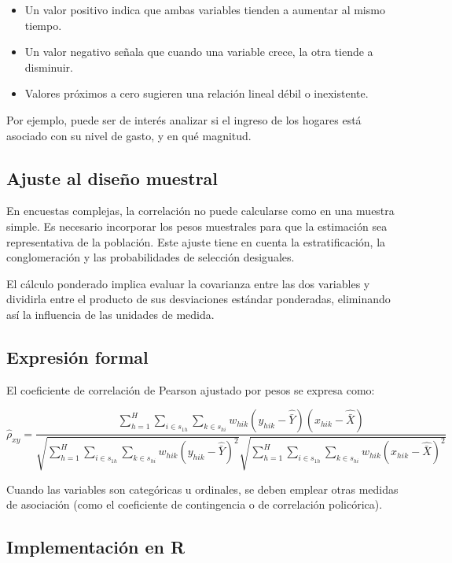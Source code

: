\documentclass[
  12pt,
]{book}
\providecommand{\tightlist}{%
  \setlength{\itemsep}{0pt}\setlength{\parskip}{0pt}}
\begin{document}
\begin{itemize}
\tightlist
\item
  Un valor positivo indica que ambas variables tienden a aumentar al mismo tiempo.
\item
  Un valor negativo señala que cuando una variable crece, la otra tiende a disminuir.
\item
  Valores próximos a cero sugieren una relación lineal débil o inexistente.
\end{itemize}

Por ejemplo, puede ser de interés analizar si el ingreso de los hogares está asociado con su nivel de gasto, y en qué magnitud.

\subsection{Ajuste al diseño muestral}\label{ajuste-al-diseuxf1o-muestral}

En encuestas complejas, la correlación no puede calcularse como en una muestra simple. Es necesario incorporar los pesos muestrales para que la estimación sea representativa de la población. Este ajuste tiene en cuenta la estratificación, la conglomeración y las probabilidades de selección desiguales.

El cálculo ponderado implica evaluar la covarianza entre las dos variables y dividirla entre el producto de sus desviaciones estándar ponderadas, eliminando así la influencia de las unidades de medida.

\subsection{Expresión formal}\label{expresiuxf3n-formal}

El coeficiente de correlación de Pearson ajustado por pesos se expresa como:

\[\hat{\rho}_{xy} = \frac{\displaystyle \sum_{h=1}^{H} \sum_{i \in s_{1h}} \sum_{k \in s_{hi}} w_{hik} (y_{hik} - \widehat{\bar{Y}})(x_{hik} - \widehat{\bar{X}})} {\sqrt{\displaystyle \sum_{h=1}^{H} \sum_{i \in s_{1h}} \sum_{k \in s_{hi}} w_{hik} (y_{hik} - \widehat{\bar{Y}})^2} \sqrt{\displaystyle \sum_{h=1}^{H} \sum_{i \in s_{1h}} \sum_{k \in s_{hi}} w_{hik} (x_{hik} - \widehat{\bar{X}})^2}}\]

Cuando las variables son categóricas u ordinales, se deben emplear otras medidas de asociación (como el coeficiente de contingencia o de correlación policórica).

\subsection{Implementación en R}\label{implementaciuxf3n-en-r}
\end{document}

